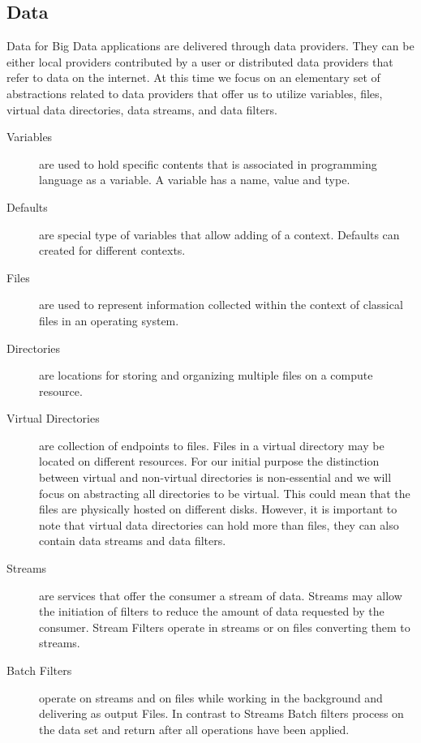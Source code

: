 \documentclass[10pt]{article}
\begin{document}
\subsection{Data}

Data for Big Data applications are delivered through data
providers. They can be either local providers contributed by a user or
distributed data providers that refer to data on the internet. At this
time we focus on an elementary set of abstractions related to data
providers that offer us to utilize variables, files, virtual data
directories, data streams, and data filters.

\begin{description}
\item[Variables] are used to hold specific contents that is associated
  in programming language as a variable. A variable has a name, value
  and type.

\item[Defaults] are special type of variables that allow adding of a
  context. Defaults can created for different contexts.

\item[Files] are used to represent information collected within the
  context of classical files in an operating system.

\item[Directories] are locations for storing and organizing multiple
  files on a compute resource.

\item[Virtual Directories] are collection
  of endpoints to files. Files in a virtual directory may be located
  on different resources. For our initial purpose the distinction
  between virtual and non-virtual directories is non-essential and we
  will focus on abstracting all directories to be virtual. This could
  mean that the files are physically hosted on different
  disks. However, it is important to note that virtual data
  directories can hold more than files, they can also contain data
  streams and data filters. 

\item[Streams] are services that offer the consumer a stream of
  data. Streams may allow the initiation of filters to reduce the
  amount of data requested by the consumer.  Stream Filters operate in
  streams or on files converting them to streams.

\item[Batch Filters] operate on streams and on files while working in
  the background and delivering as output Files. In contrast to
  Streams Batch filters process on the data set and return after all
  operations have been applied.


\end{description}
\end{document}
